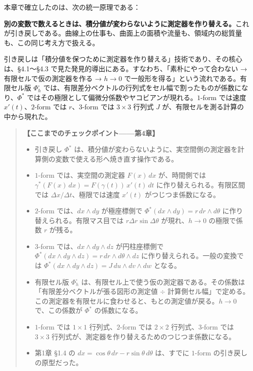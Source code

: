 \documentclass[a4paper,12pt,openany]{book}
\begin{document}
本章で確立したのは、次の統一原理である：

\textbf{別の変数で数えるときは、積分値が変わらないように測定器を作り替える。}これが引き戻しである。曲線上の仕事も、曲面上の面積や流量も、領域内の総質量も、この同じ考え方で扱える。

引き戻しは「積分値を保つために測定器を作り替える」技術であり、その核心は、§4.1〜§4.3
で見た発見的導出にある。すなわち、「素朴にやって合わない →
有限セルで仮の測定器を作る → \(h\to0\)
で一般形を得る」という流れである。有限セル版 \(\Phi_h^\square\)
では、有限差分ベクトルの行列式をセル幅で割ったものが係数になり、\(\Phi^*\)
ではその極限として偏微分係数やヤコビアンが現れる。\(1\)-form では速度
\(x'(t)\)、\(2\)-form では \(r\)、\(3\)-form では \(3\times3\) 行列式
\(J\) が、有限セルを測る計算の中から現れた。

\begin{quote}
\textbf{【ここまでのチェックポイント——第4章】}

\begin{itemize}
\item
  引き戻し \(\Phi^*\)
  は、積分値が変わらないように、実空間側の測定器を計算側の変数で使える形へ焼き直す操作である。
\item
  \(1\)-form では、実空間の測定器 \(F(x)\,dx\) が、時間側では
  \(\gamma^*(F(x)\,dx)=F(\gamma(t))\,x'(t)\,dt\)
  に作り替えられる。有限区間では \(\Delta x/\Delta t\)、極限では速度
  \(x'(t)\) がつじつま係数になる。
\item
  \(2\)-form では、\(dx\wedge dy\) が極座標側で
  \(\Phi^*(dx\wedge dy)=r\,dr\wedge d\theta\)
  に作り替えられる。有限マス目では \(r\Delta r\sin\Delta\theta\)
  が現れ、\(h\to0\) の極限で係数 \(r\) が残る。
\item
  \(3\)-form では、\(dx\wedge dy\wedge dz\) が円柱座標側で
  \(\Phi^*(dx\wedge dy\wedge dz)=r\,dr\wedge d\theta\wedge dz\)
  に作り替えられる。一般の変換では
  \(\Phi^*(dx\wedge dy\wedge dz)=J\,du\wedge dv\wedge dw\) となる。
\item
  有限セル版 \(\Phi_h^\square\)
  は、有限セル上で使う仮の測定器である。その係数は「有限差分ベクトルが張る図形の測定値
  \(\div\)
  計算側セル幅」で定める。この測定器を有限セルに食わせると、もとの測定値が戻る。\(h\to0\)
  で、この係数が \(\Phi^*\) の係数になる。
\item
  \(1\)-form では \(1\times1\) 行列式、\(2\)-form では \(2\times2\)
  行列式、\(3\)-form では \(3\times3\)
  行列式が、測定器を作り替えるためのつじつま係数になる。
\item
  第1章 §1.4 の \(dx = \cos\theta\,dr - r\sin\theta\,d\theta\)
  は、すでに \(1\)-form の引き戻しの原型だった。
\end{itemize}
\end{quote}
\end{document}
